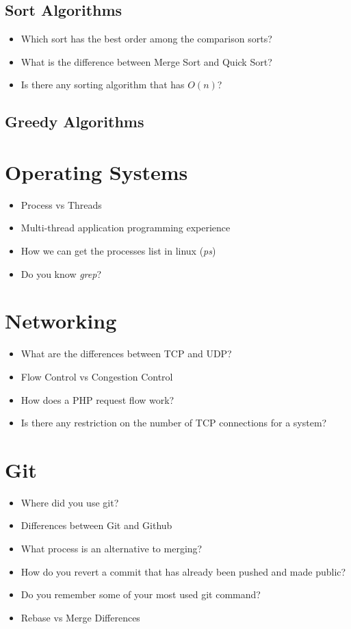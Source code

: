 \documentclass[]{book}
\begin{document}
\subsection{Sort Algorithms}

\begin{itemize}
  \item Which sort has the best order among the comparison sorts?
  \item What is the difference between Merge Sort and Quick Sort?
  \item Is there any sorting algorithm that has $O(n)$?
\end{itemize}

\subsection{Greedy Algorithms}

\section{Operating Systems}
\begin{itemize}
  \item Process vs Threads
  \item Multi-thread application programming experience
  \item How we can get the processes list in linux (\textit{ps})
  \item Do you know \textit{grep}?
\end{itemize}

\section{Networking}
\begin{itemize}
  \item What are the differences between TCP and UDP\@?
  \item Flow Control vs Congestion Control
  \item How does a PHP request flow work?
  \item Is there any restriction on the number of TCP connections for a system?
\end{itemize}

\section{Git}
\begin{itemize}
  \item Where did you use git?
  \item Differences between Git and Github
  \item What process is an alternative to merging?
  \item How do you revert a commit that has already been pushed and made public?
  \item Do you remember some of your most used git command?
  \item Rebase vs Merge Differences
\end{itemize}
\end{document}
